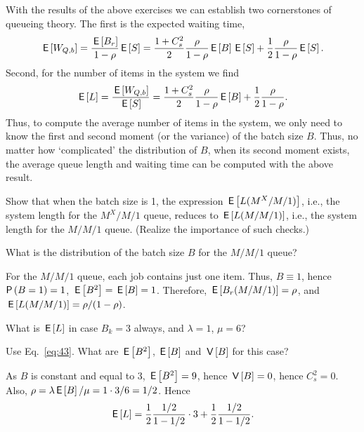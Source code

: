 With the results of the above exercises we can establish two cornerstones of queueing theory. The first is the expected waiting time, 
\begin{equation}
\,\mathsf{E}\left[W_{Q,b}\right] = \frac{\,\mathsf{E}\left[B_r\right]}{1-\rho} \,\mathsf{E}\left[S\right] = 
\frac{1+C_s^2}2 \frac{\rho}{1-\rho} \,\mathsf{E}\left[B\right] \,\mathsf{E}\left[S\right] + \frac12\frac\rho{1-\rho}\,\mathsf{E}\left[S\right].
\end{equation}
Second, for the number of items in the system we find
\begin{equation}\label{eq:43}
\,\mathsf{E}\left[L\right]  =\frac{\,\mathsf{E}\left[W_{Q,b}\right]}{\,\mathsf{E}\left[S\right]} =  
\frac{1+C_s^2}2 \frac{\rho}{1-\rho} \,\mathsf{E}\left[B\right] + \frac12\frac\rho{1-\rho}.
\end{equation}
Thus, to compute the average number of items in the system, we only
need to know the first and second moment (or the variance) of the
batch size $B$. Thus, no matter how `complicated' the distribution of
$B$, when its second moment exists, the average queue length and
waiting time can be computed with the above result. 

\begin{exercise}
  Show that  when the batch size is 1, the expression $\,\mathsf{E}\left[L(M^X/M/1)\right]$, i.e., the system length for the $M^X/M/1$ queue, reduces to
  $\,\mathsf{E}\left[L(M/M/1)\right]$, i.e., the system length for the $M/M/1$ queue. 
(Realize the importance of such checks.)
  \begin{hint}
What is the    distribution of the batch size $B$ for the $M/M/1$ queue?
  \end{hint}
  \begin{solution}
    For the $M/M/1$ queue, each job contains just one item. Thus,
    $B\equiv 1$, hence $\P{B=1}=1$, $\,\mathsf{E}\left[B^2\right]=\,\mathsf{E}\left[B\right] =1$. Therefore,
    $\,\mathsf{E}\left[B_r(M/M/1)\right]= \rho$, and $\,\mathsf{E}\left[L(M/M/1)\right]=\rho/(1-\rho)$. 
  \end{solution}
\end{exercise}


\begin{exercise}
  What is $\,\mathsf{E}\left[L\right]$ in case $B_k=3$ always, and $\lambda=1$, $\mu=6$?  
  \begin{hint}
Use Eq.~\ref{eq:43}. What are $\,\mathsf{E}\left[B^2\right]$, $\,\mathsf{E}\left[B\right]$ and $\,\mathsf{V}\left[B\right]$ for this case?
  \end{hint}
\begin{solution}
  As $B$ is constant and equal to 3, $\,\mathsf{E}\left[B^2\right]=9$, hence $\,\mathsf{V}\left[B\right]=0$,
  hence $C_s^2=0$.  Also, $\rho=\lambda\,\mathsf{E}\left[B\right]/\mu=1\cdot 3/6=1/2$. Hence
  \begin{equation*}
    \,\mathsf{E}\left[L\right] = \frac 1 2 \frac{1/2}{1-1/2}\cdot 3 + \frac12\frac{1/2}{1-1/2}.
  \end{equation*}
  \end{solution}
\end{exercise}

